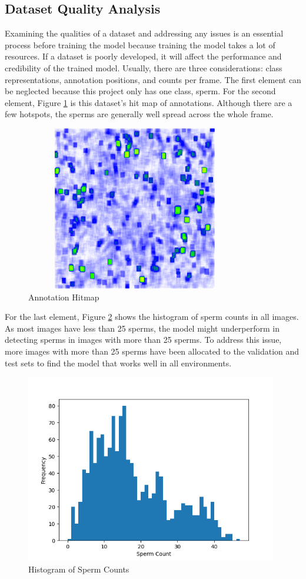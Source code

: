 \subsection{Dataset Quality Analysis}
Examining the qualities of a dataset and addressing any issues is an essential process before training the model because training the model takes a lot of resources. If a dataset is poorly developed, it will affect the performance and credibility of the trained model. Usually, there are three considerations: class representations, annotation positions, and counts per frame. The first element can be neglected because this project only has one class, sperm. For the second element, Figure \ref{hitmap} is this dataset's hit map of annotations. Although there are a few hotspots, the sperms are generally well spread across the whole frame.
\newpage
\begin{figure}[ht]
\centering
\includegraphics[width=9.6cm, height=7.2cm]{Images/hitmap.png}
\caption{Annotation Hitmap}
\label{hitmap}
\end{figure}

For the last element, Figure \ref{Hist} shows the histogram of sperm counts in all images. As most images have less than 25 sperms, the model might underperform in detecting sperms in images with more than 25 sperms. To address this issue, more images with more than 25 sperms have been allocated to the validation and test sets to find the model that works well in all environments. 

\begin{figure}[h!]
\centering
\includegraphics[width=11cm]{Images/Histogram.png}
\caption{Histogram of Sperm Counts}
\label{Hist}
\end{figure}

